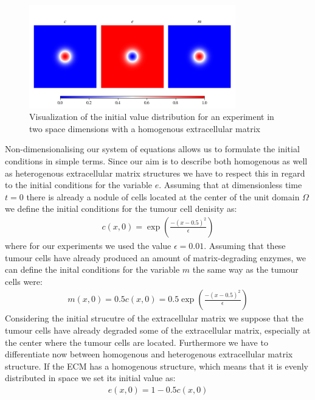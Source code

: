 \begin{figure}[h]
    \centering
    \label{fig:Initial_Value_Distribution}
    \includegraphics[width=0.8\textwidth]{resources/images/2D_initial_conditions_homogenous_ECM.png}
    \caption{Visualization of the initial value distribution for an experiment in two space dimensions with a homogenous extracellular matrix}
    \label{fig:2D_homogenous_ECM_initial}
\end{figure}
Non-dimensionalising our system of equations allows us to formulate the initial conditions in simple terms. Since our aim is to describe both homogenous as well as heterogenous extracellular matrix structures we have to respect this in regard to the initial conditions for the variable $e$.\newline 
Assuming that at dimensionless time $t=0$ there is already a nodule of cells located at the center of the unit domain $\Omega$ we define the initial conditions for the tumour cell denisity as:
\begin{align*}
    c(x,0)= \exp(\frac{-(x-0.5)^2}{\epsilon})
\end{align*}
where for our experiments we used the value $\epsilon=0.01$.\newline
Assuming that these tumour cells have already produced an amount of matrix-degrading enzymes, we can define the inital conditions for the variable $m$ the same way as the tumour cells were:
\begin{align*}
    m(x,0) = 0.5 c(x,0) = 0.5 \exp(\frac{-(x-0.5)^2}{\epsilon})
\end{align*}
Considering the initial strucutre of the extracellular matrix we suppose that the tumour cells have already degraded some of the extracellular matrix, especially at the center where the tumour cells are located. Furthermore we have to differentiate now between homogenous and heterogenous extracellular matrix structure. If the ECM has a homogenous structure, which means that it is evenly distributed in space we set its initial value as:
\begin{align*}
    e(x,0) = 1 - 0.5 c(x,0)
\end{align*}
